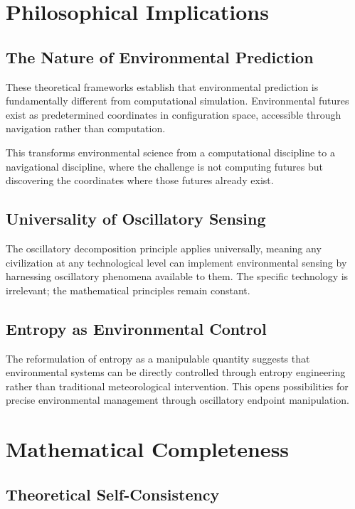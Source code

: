 \documentclass[12pt,a4paper]{article}
\begin{document}
\section{Philosophical Implications}

\subsection{The Nature of Environmental Prediction}

These theoretical frameworks establish that environmental prediction is fundamentally different from computational simulation. Environmental futures exist as predetermined coordinates in configuration space, accessible through navigation rather than computation.

This transforms environmental science from a computational discipline to a navigational discipline, where the challenge is not computing futures but discovering the coordinates where those futures already exist.

\subsection{Universality of Oscillatory Sensing}

The oscillatory decomposition principle applies universally, meaning any civilization at any technological level can implement environmental sensing by harnessing oscillatory phenomena available to them. The specific technology is irrelevant; the mathematical principles remain constant.

\subsection{Entropy as Environmental Control}

The reformulation of entropy as a manipulable quantity suggests that environmental systems can be directly controlled through entropy engineering rather than traditional meteorological intervention. This opens possibilities for precise environmental management through oscillatory endpoint manipulation.

\section{Mathematical Completeness}

\subsection{Theoretical Self-Consistency}
\end{document}
